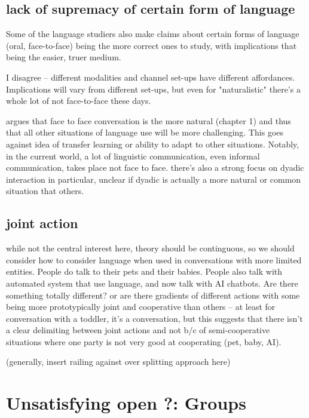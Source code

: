 \documentclass[]{article}
\begin{document}
\subsection{lack of supremacy of certain form of language}
Some of the language studiers also make claims about certain forms of language (oral, face-to-face) being the more correct ones to study, with implications that being the easier, truer medium. 

I disagree -- different modalities and channel set-ups have different affordances. Implications will vary from different set-ups, but even for "naturalistic" there's a whole lot of not face-to-face these days. 

\cite{clark1996} argues that face to face conversation is the more natural (chapter 1) and thus that all other situations of language use will be more challenging. This goes against idea of transfer learning or ability to adapt to other situations. Notably, in the current world, a lot of linguistic communication, even informal communication, takes place not face to face. there's also a strong focus on dyadic interaction in particular, unclear if dyadic is actually a more natural or common situation that others.

\subsection{joint action}
\cite{clark1996} while not the central interest here, theory should be continguous, so we should consider how to consider language when used in conversations with more limited entities. People do talk to their pets and their babies. People also talk with automated system that use language, and now talk with AI chatbots. Are there something totally different? or are there gradients of different actions with some being more prototypically joint and cooperative than others -- at least for conversation with a toddler, it's a conversation, but this suggests that there isn't a clear delimiting between joint actions and not b/c of semi-cooperative situations where one party is not very good at cooperating (pet, baby, AI). 

(generally, insert railing against over splitting approach here)



\section{Unsatisfying open ?: Groups}
\end{document}
